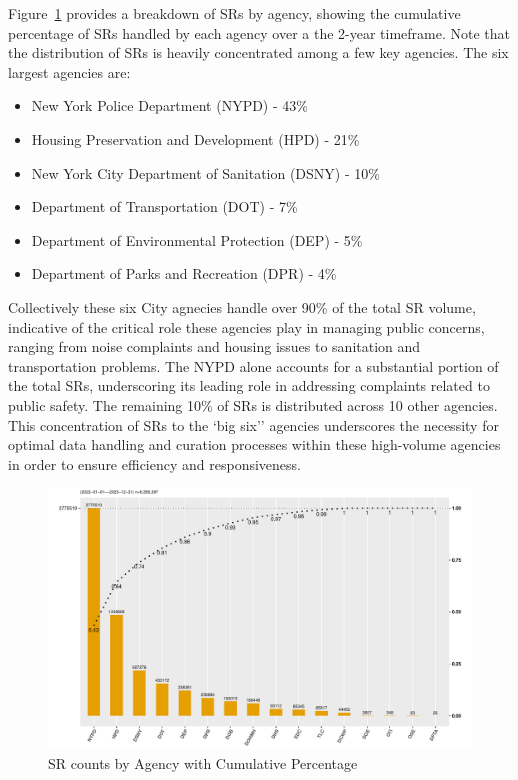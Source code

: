 \documentclass[linenumber]{jdsart}
\begin{document}
Figure~\ref{fig:SRcountbyAgency} provides a breakdown of SRs by
agency, showing the cumulative percentage of SRs handled by each
agency over a the 2-year timeframe. Note that the
distribution of SRs is heavily concentrated among a few key 
agencies. The six largest agencies are:

\begin{itemize}
    \item New York Police Department (NYPD) - 43\%
    \item Housing Preservation and Development (HPD) - 21\%
    \item New York City Department of Sanitation (DSNY) - 10\%
    \item Department of Transportation (DOT) - 7\%
    \item Department of Environmental Protection (DEP) - 5\%
    \item Department of Parks and Recreation (DPR) - 4\%
\end{itemize}

Collectively these six City agnecies handle over 90\% of the total SR 
volume, indicative of the critical role these agencies play in managing
public concerns, ranging from noise complaints and housing issues to
sanitation and transportation problems. The NYPD alone accounts for a
substantial portion of the total SRs, underscoring its leading role in
addressing complaints related to public safety. The remaining
10\% of SRs is distributed across 10 other
agencies. This concentration of SRs to the `big six'' agencies 
underscores the necessity for optimal data handling and curation processes 
within these high-volume agencies in order to ensure 
efficiency and responsiveness.


\begin{figure}[tbp]
	\centering
	\includegraphics[width = \textwidth]{SRs_by_Agency.pdf}
  	\caption{SR counts by Agency with Cumulative Percentage}
	\label{fig:SRcountbyAgency}
\end{figure}
\end{document}
